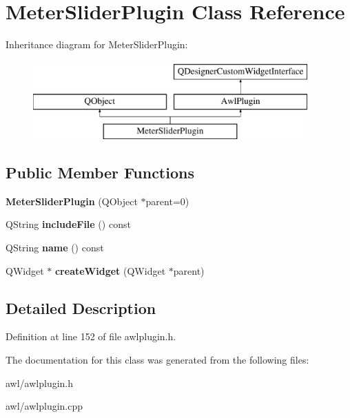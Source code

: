 \hypertarget{class_meter_slider_plugin}{}\section{Meter\+Slider\+Plugin Class Reference}
\label{class_meter_slider_plugin}
Inheritance diagram for Meter\+Slider\+Plugin\+:\begin{figure}[H]
\begin{center}
\leavevmode
\includegraphics[height=3.000000cm]{class_meter_slider_plugin}
\end{center}
\end{figure}
\subsection*{Public Member Functions}
\begin{DoxyCompactItemize}
\item 
\mbox{\label{class_meter_slider_plugin_aff85be5ea8b9b3a80b71bdc011b532ad}} 
{\bfseries Meter\+Slider\+Plugin} (Q\+Object $\ast$parent=0)
\item 
\mbox{\label{class_meter_slider_plugin_ae20050d0f58d06082eaa8a44667fa8f5}} 
Q\+String {\bfseries include\+File} () const
\item 
\mbox{\label{class_meter_slider_plugin_ab5bba5bd785cc1f419547adee556314f}} 
Q\+String {\bfseries name} () const
\item 
\mbox{\label{class_meter_slider_plugin_a6893824fe4d6cbd1f4d7f406d9a7d58c}} 
Q\+Widget $\ast$ {\bfseries create\+Widget} (Q\+Widget $\ast$parent)
\end{DoxyCompactItemize}


\subsection{Detailed Description}


Definition at line 152 of file awlplugin.\+h.



The documentation for this class was generated from the following files\+:\begin{DoxyCompactItemize}
\item 
awl/awlplugin.\+h\item 
awl/awlplugin.\+cpp\end{DoxyCompactItemize}
